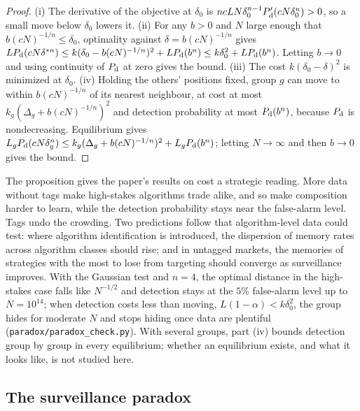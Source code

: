 \documentclass[12pt]{article}
\theoremstyle{definition}
\theoremstyle{remark}
\begin{document}
\begin{proof}
(i) The derivative of the objective at $\delta_0$ is $ncLN\delta_0^{n-1}P_{\rm d}'(cN\delta_0^n)>0$, so a small move below $\delta_0$ lowers it. (ii) For any $b>0$ and $N$ large enough that $b(cN)^{-1/n}\le\delta_0$, optimality against $\delta=b(cN)^{-1/n}$ gives $LP_{\rm d}(cN\delta^{*n})\le k(\delta_0-b(cN)^{-1/n})^2+LP_{\rm d}(b^n)\le k\delta_0^2+LP_{\rm d}(b^n)$. Letting $b\to0$ and using continuity of $P_{\rm d}$ at zero gives the bound. (iii) The cost $k(\delta_0-\delta)^2$ is minimized at $\delta_0$. (iv) Holding the others' positions fixed, group $g$ can move to within $b(cN)^{-1/n}$ of its nearest neighbour, at cost at most $k_g(\Delta_g+b(cN)^{-1/n})^2$ and detection probability at most $P_{\rm d}(b^n)$, because $P_{\rm d}$ is nondecreasing. Equilibrium gives $L_gP_{\rm d}(cN\delta_g^n)\le k_g(\Delta_g+b(cN)^{-1/n})^2+L_gP_{\rm d}(b^n)$; letting $N\to\infty$ and then $b\to0$ gives the bound.
\end{proof}

The proposition gives the paper's results on cost a strategic reading. More data without tags make high-stakes algorithms trade alike, and so make composition harder to learn, while the detection probability stays near the false-alarm level. Tags undo the crowding. Two predictions follow that algorithm-level data could test: where algorithm identification is introduced, the dispersion of memory rates across algorithm classes should rise; and in untagged markets, the memories of strategies with the most to lose from targeting should converge as surveillance improves. With the Gaussian test and $n=4$, the optimal distance in the high-stakes case falls like $N^{-1/2}$ and detection stays at the $5\%$ false-alarm level up to $N=10^{14}$; when detection costs less than moving, $L(1-\alpha)<k\delta_0^2$, the group hides for moderate $N$ and stops hiding once data are plentiful (\nolinkurl{paradox/paradox_check.py}). With several groups, part (iv) bounds detection group by group in every equilibrium; whether an equilibrium exists, and what it looks like, is not studied here.

\subsection{The surveillance paradox}\label{app:paradox}
\end{document}
